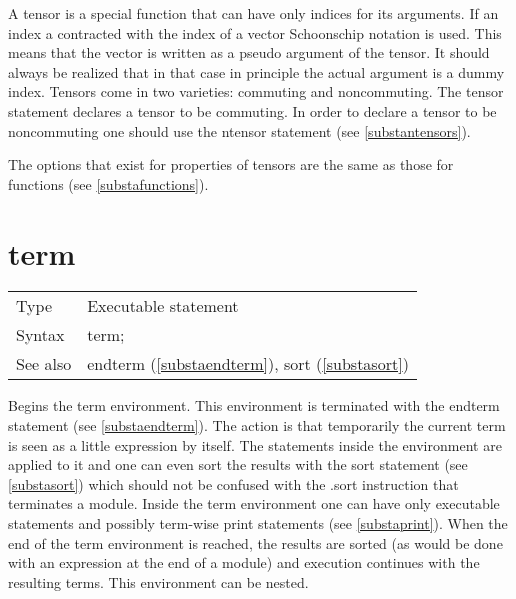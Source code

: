 \noindent A tensor is a special function that can have only 
indices for its arguments. If an index a contracted with the index of a 
vector Schoonschip notation is used. This means that the 
vector is written as a pseudo argument of the tensor. It should always be 
realized that in that case in principle the actual argument is a dummy 
index. Tensors come in two varieties: commuting and 
noncommuting. The tensor statement declares a tensor to 
be commuting. In order to declare a tensor to be noncommuting one should 
use the ntensor statement (see \ref{substantensors}).

\noindent The options that exist for properties of tensors are the same as 
those for functions (see \ref{substafunctions}). \vspace{10mm}


\section{term}
\label{substaterm}

\noindent \begin{tabular}{ll}
Type & Executable statement\\
Syntax & term;
\\ See also & endterm (\ref{substaendterm}), sort (\ref{substasort})
\end{tabular} \vspace{4mm}

\noindent Begins the term environment. 
This environment is terminated with the endterm statement 
(see \ref{substaendterm}). The action is that temporarily the current term 
is seen as a little expression by itself. The statements inside the 
environment are applied to it and one can even sort the results with the 
sort statement (see \ref{substasort}) which should not be 
confused with the .sort instruction that terminates a module. 
Inside the term environment one can have only executable statements and 
possibly term-wise print statements (see \ref{substaprint}). When the end 
of the term environment is reached, the results are sorted (as would be 
done with an expression at the end of a module) and execution continues 
with the resulting terms. This environment can be nested. 
\vspace{10mm}

